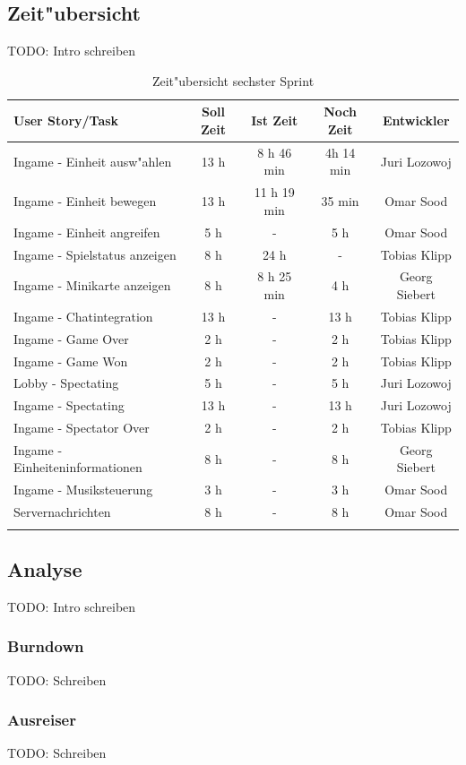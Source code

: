 \documentclass[12pt, titlepage]{scrartcl}
\begin{document}
    	\subsection{Zeit"ubersicht}
    		TODO: Intro schreiben
    		\begin{longtable}[H]{p{6cm} c c c c }
    			\label{Time_2}
    			\textbf{User Story/Task} & \textbf{Soll Zeit} & \textbf{Ist Zeit} & \textbf{Noch Zeit} & \textbf{Entwickler} \\
    			\toprule
    			\endhead
    			Ingame - Einheit ausw"ahlen & 13 h & 8 h 46 min & 4h 14 min & Juri Lozowoj \\
    			Ingame - Einheit bewegen & 13 h & 11 h 19 min & 35 min & Omar Sood \\
    			Ingame - Einheit angreifen & 5 h & - & 5 h & Omar Sood \\
    			Ingame - Spielstatus anzeigen & 8 h & 24 h & - & Tobias Klipp \\
    			Ingame - Minikarte anzeigen & 8 h & 8 h 25 min & 4 h & Georg Siebert \\
    			Ingame - Chatintegration & 13 h & - & 13 h & Tobias Klipp \\
    			Ingame - Game Over & 2 h & - & 2 h & Tobias Klipp \\
    			Ingame - Game Won & 2 h & - & 2 h & Tobias Klipp \\
    			Lobby - Spectating & 5 h & - & 5 h & Juri Lozowoj \\
    			Ingame - Spectating & 13 h & - & 13 h & Juri Lozowoj \\
    			Ingame - Spectator Over & 2 h & - & 2 h & Tobias Klipp \\
    			Ingame - Einheiteninformationen & 8 h & - & 8 h & Georg Siebert \\
    			Ingame - Musiksteuerung & 3 h & - & 3 h & Omar Sood \\
    			\midrule
    			Servernachrichten & 8 h & - & 8 h & Omar Sood\\
    			\caption{Zeit"ubersicht sechster Sprint}
    		\end{longtable}
    	\subsection{Analyse}
    		TODO: Intro schreiben
	    	\subsubsection{Burndown}
	    		TODO: Schreiben
	    	\subsubsection{Ausreiser}
	    		TODO: Schreiben
\end{document}
